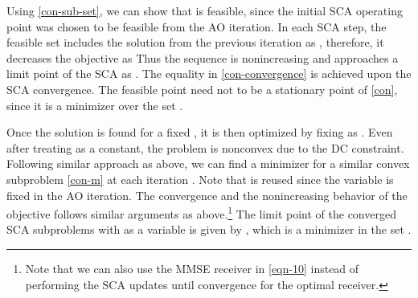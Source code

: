 Using \eqref{con-sub-set}, we can show that  is feasible, since the initial \ac{SCA} operating point  was chosen to be feasible from the  \ac{AO} iteration. In each \ac{SCA} step, the feasible set includes the solution from the previous iteration as , therefore, it decreases the objective as \cite{lanckriet2009convergence,scutari_1,amir}
\iftoggle{single_column}{
\begin{equation} \label{con-convergence}
f(\iter{\mx}{0}{i},\iter{\my}{\ast}{i-1},\iter{\mz}{0}{i}) \geq f(\iter{\mx}{k}{i},\iter{\my}{\ast}{i-1},\iter{\mz}{k}{i}) \geq f(\iter{\mx}{k+1}{i},\iter{\my}{\ast}{i-1},\iter{\mz}{k+1}{i}) \geq f(\iter{\mx}{\ast}{i},\iter{\my}{\ast}{i-1},\iter{\mz}{\ast|\my}{i}). 
\end{equation}}{
\begin{multline} \label{con-convergence} \allowdisplaybreaks
f(\iter{\mx}{0}{i},\iter{\my}{\ast}{i-1},\iter{\mz}{0}{i}) \geq f(\iter{\mx}{k}{i},\iter{\my}{\ast}{i-1},\iter{\mz}{k}{i}) \\ \geq f(\iter{\mx}{k+1}{i},\iter{\my}{\ast}{i-1},\iter{\mz}{k+1}{i}) \geq f(\iter{\mx}{\ast}{i},\iter{\my}{\ast}{i-1},\iter{\mz}{\ast|\my}{i}). 
\end{multline}}
Thus the sequence  is nonincreasing and approaches a limit point of the \ac{SCA} as . The equality in \eqref{con-convergence} is achieved upon the \ac{SCA} convergence. The feasible point  need not to be a stationary point of \eqref{con}, since it is a minimizer over the set . 

Once the solution is found for a fixed \me{\my}, it is then optimized by fixing \me{\mx} as . Even after treating \me{\mx} as a constant, the problem is nonconvex due to the \ac{DC} constraint. Following similar approach as above, we can find a minimizer  for a similar convex subproblem \eqref{con-m} at each iteration . Note that  is reused since the variable \me{\mx} is fixed in the  \ac{AO} iteration. The convergence and the nonincreasing behavior of the objective follows similar arguments as above.\footnote{Note that we can also use the \ac{MMSE} receiver in \eqref{eqn-10} instead of performing the \ac{SCA} updates until convergence for the optimal receiver.} The limit point of the converged \ac{SCA} subproblems with \me{\my} as a variable is given by , which is a minimizer in the set .

